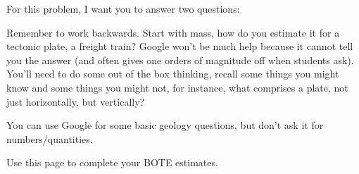 \begin{activity}
\begin{questions}
        For this problem, I want you to answer two questions:

        Remember to work backwards. Start with mass, how do you estimate it for a tectonic plate, a freight train?  Google won't be much help because it cannot tell you the answer (and often gives one orders of magnitude off when students ask).  You'll need to do some out of the box thinking, recall some things you might know and some things you might not, for instance, what comprises a plate, not just horizontally, but vertically?

        You can use Google for some basic geology questions, but don't ask it for numbers/quantities.
\end{questions}

\clearpage
Use this page to complete your BOTE estimates.
\end{activity}